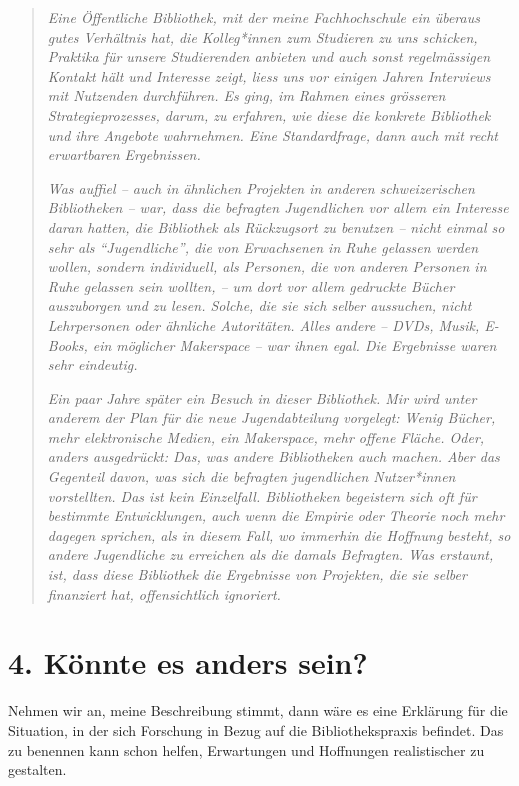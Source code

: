\documentclass[a4paper,
fontsize=11pt,
oneside,
numbers=noperiodatend,
parskip=half-,
bibliography=totoc,
final
]{scrartcl}
\begin{document}
\begin{quote}
\emph{Eine Öffentliche Bibliothek, mit der meine Fachhochschule ein
überaus gutes Verhältnis hat, die Kolleg*innen zum Studieren zu uns
schicken, Praktika für unsere Studierenden anbieten und auch sonst
regelmässigen Kontakt hält und Interesse zeigt, liess uns vor einigen
Jahren Interviews mit Nutzenden durchführen. Es ging, im Rahmen eines
grösseren Strategieprozesses, darum, zu erfahren, wie diese die konkrete
Bibliothek und ihre Angebote wahrnehmen. Eine Standardfrage, dann auch
mit recht erwartbaren Ergebnissen.}

\emph{Was auffiel -- auch in ähnlichen Projekten in anderen
schweizerischen Bibliotheken -- war, dass die befragten Jugendlichen vor
allem ein Interesse daran hatten, die Bibliothek als Rückzugsort zu
benutzen -- nicht einmal so sehr als \enquote{Jugendliche}, die von
Erwachsenen in Ruhe gelassen werden wollen, sondern individuell, als
Personen, die von anderen Personen in Ruhe gelassen sein wollten, -- um
dort vor allem gedruckte Bücher auszuborgen und zu lesen. Solche, die
sie sich selber aussuchen, nicht Lehrpersonen oder ähnliche Autoritäten.
Alles andere -- DVDs, Musik, E-Books, ein möglicher Makerspace -- war
ihnen egal. Die Ergebnisse waren sehr eindeutig.}

\emph{Ein paar Jahre später ein Besuch in dieser Bibliothek. Mir wird
unter anderem der Plan für die neue Jugendabteilung vorgelegt: Wenig
Bücher, mehr elektronische Medien, ein Makerspace, mehr offene Fläche.
Oder, anders ausgedrückt: Das, was andere Bibliotheken auch machen. Aber
das Gegenteil davon, was sich die befragten jugendlichen Nutzer*innen
vorstellten. Das ist kein Einzelfall. Bibliotheken begeistern sich oft
für bestimmte Entwicklungen, auch wenn die Empirie oder Theorie noch
mehr dagegen sprichen, als in diesem Fall, wo immerhin die Hoffnung
besteht, so andere Jugendliche zu erreichen als die damals Befragten.
Was erstaunt, ist, dass diese Bibliothek die Ergebnisse von Projekten,
die sie selber finanziert hat, offensichtlich ignoriert.}
\end{quote}

\hypertarget{kuxf6nnte-es-anders-sein}{%
\section{4. Könnte es anders
sein?}\label{kuxf6nnte-es-anders-sein}}

Nehmen wir an, meine Beschreibung stimmt, dann wäre es eine Erklärung
für die Situation, in der sich Forschung in Bezug auf die
Bibliothekspraxis befindet. Das zu benennen kann schon helfen,
Erwartungen und Hoffnungen realistischer zu gestalten.
\end{document}
